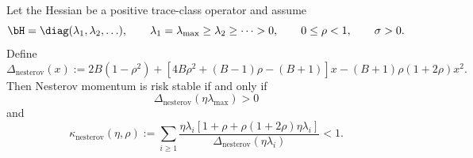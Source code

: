 \documentclass[11pt]{article}
\newcommand{\nesterov}{\mathrm{nesterov}}
\begin{document}
\begin{theorem}
\label{app:thm:nesterov-stability}
Let the Hessian be a positive trace-class operator and assume
\[
\bH=\diag(\lambda_1,\lambda_2,\ldots),
\qquad
\lambda_1=\lambda_{\max}\geq\lambda_2\geq\cdots>0,
\qquad
0\leq\rho<1,
\qquad
\sigma>0.
\]
Define
\[
\Delta_{\nesterov}(x)
:=
2B(1-\rho^2)
+
\left[4B\rho^2+(B-1)\rho-(B+1)\right]x
-
(B+1)\rho(1+2\rho)x^2.
\]
Then Nesterov momentum is risk stable if and only if
\begin{equation}
\label{app:eq:nesterov-local-stability}
\Delta_{\nesterov}(\eta\lambda_{\max})>0
\end{equation}
and
\begin{equation}
\label{app:eq:nesterov-global-stability}
\kappa_{\nesterov}(\eta,\rho)
:=
\sum_{i\geq1}
\frac{
\eta\lambda_i
\left[1+\rho+\rho(1+2\rho)\eta\lambda_i\right]
}{
\Delta_{\nesterov}(\eta\lambda_i)
}
<1.
\end{equation}
\end{theorem}
\end{document}
